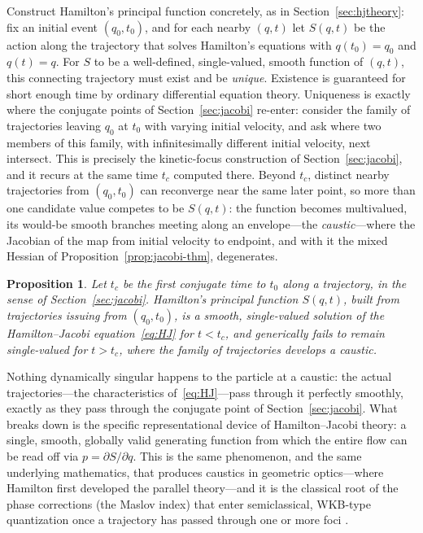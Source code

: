 \documentclass[11pt]{article}
\newtheorem{proposition}{Proposition}[section]
\begin{document}
Construct Hamilton's principal function concretely, as in Section~\ref{sec:hjtheory}: fix an initial event $(q_0,t_0)$, and for each nearby $(q,t)$ let $S(q,t)$ be the action along the trajectory that solves Hamilton's equations with $q(t_0)=q_0$ and $q(t)=q$. For $S$ to be a well-defined, single-valued, smooth function of $(q,t)$, this connecting trajectory must exist and be \emph{unique}. Existence is guaranteed for short enough time by ordinary differential equation theory. Uniqueness is exactly where the conjugate points of Section~\ref{sec:jacobi} re-enter: consider the family of trajectories leaving $q_0$ at $t_0$ with varying initial velocity, and ask where two members of this family, with infinitesimally different initial velocity, next intersect. This is precisely the kinetic-focus construction of Section~\ref{sec:jacobi}, and it recurs at the same time $t_c$ computed there. Beyond $t_c$, distinct nearby trajectories from $(q_0,t_0)$ can reconverge near the same later point, so more than one candidate value competes to be $S(q,t)$: the function becomes multivalued, its would-be smooth branches meeting along an envelope---the \emph{caustic}---where the Jacobian of the map from initial velocity to endpoint, and with it the mixed Hessian of Proposition~\ref{prop:jacobi-thm}, degenerates.

\begin{proposition}
\label{prop:caustic}
Let $t_c$ be the first conjugate time to $t_0$ along a trajectory, in the sense of Section~\ref{sec:jacobi}. Hamilton's principal function $S(q,t)$, built from trajectories issuing from $(q_0,t_0)$, is a smooth, single-valued solution of the Hamilton--Jacobi equation~\eqref{eq:HJ} for $t<t_c$, and generically fails to remain single-valued for $t>t_c$, where the family of trajectories develops a caustic.
\end{proposition}

Nothing dynamically singular happens to the particle at a caustic: the actual trajectories---the characteristics of~\eqref{eq:HJ}---pass through it perfectly smoothly, exactly as they pass through the conjugate point of Section~\ref{sec:jacobi}. What breaks down is the specific representational device of Hamilton--Jacobi theory: a single, smooth, globally valid generating function from which the entire flow can be read off via $p=\partial S/\partial q$. This is the same phenomenon, and the same underlying mathematics, that produces caustics in geometric optics---where Hamilton first developed the parallel theory---and it is the classical root of the phase corrections (the Maslov index) that enter semiclassical, WKB-type quantization once a trajectory has passed through one or more foci \citep{gray2009}.
\end{document}
